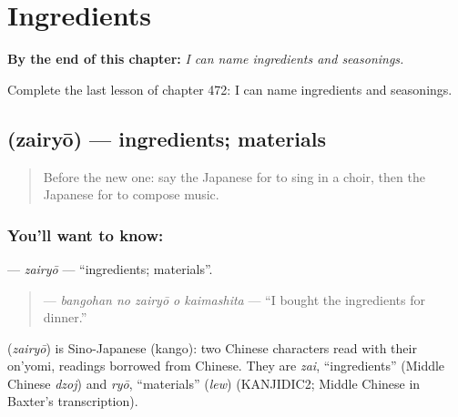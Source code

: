 
\chapter{Ingredients}
\label{ch:ja-ingredients}

\begin{chapteropening}
\textbf{By the end of this chapter:} \emph{I can name ingredients and seasonings.}

Complete the last lesson of chapter 472: I can name ingredients and seasonings.
\end{chapteropening}

\section[\texorpdfstring{\ja{ざいりょう} (zairyō)}{ざいりょう (zairyō)}]{ (zairyō) — ingredients; materials}

\label{lesson:JA-C472-zairyou}



\begin{quote}
Before the new one: say the Japanese for to sing in a choir, then the Japanese for to compose music.
\end{quote}

\subsection*{You'll want to know: }
\textbf{} — \emph{zairyō} — \textquotedblleft{}ingredients; materials\textquotedblright{}.

\begin{quote}
\textbf{  } — \emph{bangohan no zairyō o kaimashita} — \textquotedblleft{}I bought the ingredients for dinner.\textquotedblright{}
\end{quote}

\begin{cousinweb}
\textbf{} (\emph{zairyō}) is Sino-Japanese (kango): two Chinese characters read with their on'yomi, readings borrowed from Chinese. They are \emph{zai}, \textquotedblleft{}ingredients\textquotedblright{} (Middle Chinese \emph{dzoj}) and \emph{ryō}, \textquotedblleft{}materials\textquotedblright{} (\emph{lew}) (KANJIDIC2; Middle Chinese in Baxter's transcription).
\end{cousinweb}

